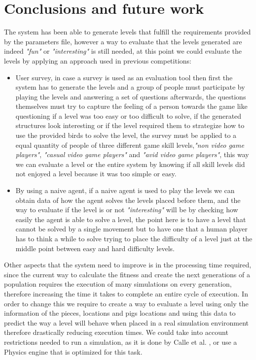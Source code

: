 \documentclass[conference]{IEEEtran}
\begin{document}
    \section{Conclusions and future work}
    \label{conclusion}
    
     The system has been able to generate levels that fulfill the requirements
     provided by the parameters file, however a way to evaluate that the levels
     generated are indeed \textit{"fun"} or \textit{"interesting"} is still
     needed, at this point we could evaluate the levels by applying an approach
     used in previous competitions:
     \begin{itemize}
        \item User survey, in case a survey is used as an evaluation tool then first
        the system has to generate the levels and a group of people must participate
        by playing the levels and answering a set of questions afterwards, the
        questions themselves must try to capture the feeling of a person towards the
        game like questioning if a level was too easy or too difficult to solve, if
        the generated structures look interesting or if the level required them to
        strategize how to use the provided birds to solve the level, the survey must
        be applied to a equal quantity of people of three different game skill
        levels,\textit{"non video game players"}, \textit{"casual video game
        players"} and \textit{"avid video game players"}, this way we can evaluate a
        level or the entire system by knowing if all skill levels did not enjoyed a
        level because it was too simple or easy.
        \item By using a naive agent, if a naive agent is used to play the levels we
        can obtain data of how the agent solves the levels placed before them, and
        the way to evaluate if the level is or not \textit{"interesting"} will be by
        checking how easily the agent is able to solve a level, the point here is
        to have a level that cannot be solved by a single movement but to have one
        that a human player has to think a while to solve trying to place the
        difficulty of a level just at the middle point between easy and hard
        difficulty levels.
    \end{itemize}
        
    Other aspects that the system need to improve is in the processing time
    required, since the current way to calculate the fitness and create the next
    generations of a population requires the execution of many 
    simulations on every generation, therefore increasing
    the time it takes to complete an entire cycle of execution. In order to
    change this we require to create a way to evaluate a level using only the
    information of the pieces, locations and pigs locations and using this data to
    predict the way a level will behave when placed in a real simulation environment
    therefore drastically reducing execution times. We could take into account restrictions 
    needed to run a simulation, as it is done by Calle et al. \cite{lauracalle}, 
    or use a Physics engine that is optimized for this task.
\end{document}
